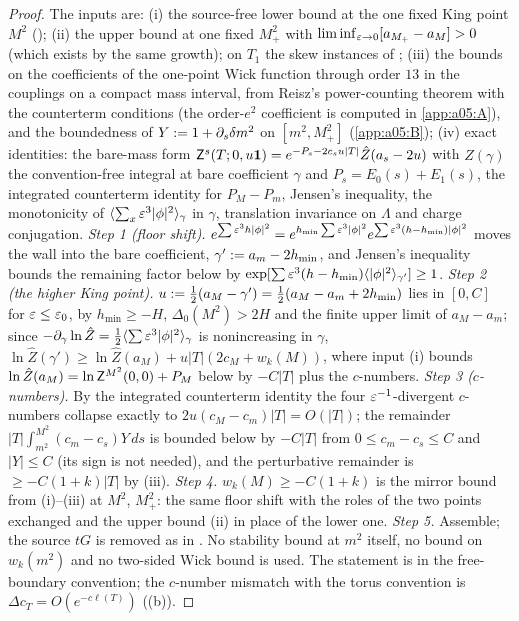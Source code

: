 \begin{proof}
The inputs are: (i) the source-free lower bound \cite[(1.14)]{Ba1} at the one fixed King point $M^2$ (); (ii) the upper bound \cite[(1.3)]{Ba2} at one fixed $M_+^2$ with $\liminf_{\varepsilon\to0}[a_{M_+}-a_M]>0$ (which exists by the same growth); on $T_1$ the skew instances of ; (iii) the bounds on the coefficients of the one-point Wick function through order $13$ in the couplings on a compact mass interval, from Reisz's power-counting theorem \cite[Thm.~1]{Rei88} with the counterterm conditions \cite[(3.33)]{K1} (the order-$e^2$ coefficient is computed in \cref{app:a05:A}), and the boundedness of $Y:=1+\partial_s\delta m^2$ on $[m^2,M_+^2]$ (\cref{app:a05:B}); (iv) exact identities: the bare-mass form $\mathsf Z^{s}(T;0,u\mathbf 1)=e^{-P_s-2c_su|T|}\hat Z(a_s-2u)$ with $\hat Z(\gamma)$ the convention-free integral at bare coefficient $\gamma$ and $P_s=E_0(s)+E_1(s)$, the integrated counterterm identity for $P_M-P_m$, Jensen's inequality, the monotonicity of $\langle\sum_x\varepsilon^3|\phi|^2\rangle_\gamma$ in $\gamma$, translation invariance on $\Lambda$ and charge conjugation.
\emph{Step 1 (floor shift).} $e^{\sum\varepsilon^3h|\phi|^2}=e^{h_{\min}\sum\varepsilon^3|\phi|^2}e^{\sum\varepsilon^3(h-h_{\min})|\phi|^2}$ moves the wall into the bare coefficient, $\gamma':= a_m-2h_{\min}$, and Jensen's inequality bounds the remaining factor below by $\exp[\sum\varepsilon^3(h-h_{\min})\langle|\phi|^2\rangle_{\gamma'}]\ge1$.
\emph{Step 2 (the higher King point).} $u:=\frac12(a_M-\gamma')=\frac12(a_M-a_m+2h_{\min})$ lies in $[0,C]$ for $\varepsilon\le\varepsilon_0$, by $h_{\min}\ge-H$, $\Delta_0(M^2)>2H$ and the finite upper limit of $a_M-a_m$; since $-\partial_\gamma\ln\hat Z=\frac12\langle\sum\varepsilon^3|\phi|^2\rangle_\gamma$ is nonincreasing in $\gamma$, $\ln\hat Z(\gamma')\ge\ln\hat Z(a_M)+u|T|(2c_M+w_k(M))$, where input (i) bounds $\ln\hat Z(a_M)=\ln\mathsf Z^{M^2}(0,0)+P_M$ below by $-C|T|$ plus the $c$-numbers.
\emph{Step 3 ($c$-numbers).} By the integrated counterterm identity the four $\varepsilon^{-1}$-divergent $c$-numbers collapse exactly to $2u(c_M-c_m)|T|=O(|T|)$; the remainder $|T|\int_{m^2}^{M^2}(c_m-c_s)Y\,ds$ is bounded below by $-C|T|$ from $0\le c_m-c_s\le C$ and $|Y|\le C$ (its sign is not needed), and the perturbative remainder is $\ge-C(1+k)|T|$ by (iii).
\emph{Step 4.} $w_k(M)\ge-C(1+k)$ is the mirror bound from (i)--(iii) at $M^2$, $M_+^2$: the same floor shift with the roles of the two points exchanged and the upper bound (ii) in place of the lower one.
\emph{Step 5.} Assemble; the source $tG$ is removed as in . No stability bound at $m^2$ itself, no bound on $w_k(m^2)$ and no two-sided Wick bound is used. The statement is in the free-boundary convention; the $c$-number mismatch with the torus convention is $\Delta c_T=O(e^{-c\ell(T)})$ ((b)).
\end{proof}

